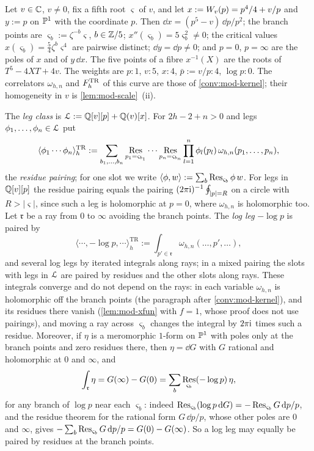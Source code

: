 \begin{defn}
\label{def:mod-curve}
Let $v\in\mathbb{C}$, $v\neq 0$, fix a fifth root $\varsigma$ of $v$, and let $x:=W_{v}(p)=p^4/4+v/p$ and $y:=p$ on $\mathbb{P}^1$ with the coordinate $p$. Then $\dd x=(p^5-v)\,\dd p/p^2$; the branch points are $\varsigma_b:=\zeta^{-b}\varsigma$, $b\in\mathbb{Z}/5$; $x''(\varsigma_b)=5\varsigma_b^2\neq 0$; the critical values $x(\varsigma_b)=\frac54\zeta^b\varsigma^4$ are pairwise distinct; $\dd y=\dd p\neq 0$; and $p=0$, $p=\infty$ are the poles of $x$ and of $y\,\dd x$. The five points of a fibre $x^{-1}(X)$ are the roots of $T^5-4XT+4v$. The weights are $p:1$, $v:5$, $x:4$, $\bar p:=v/p:4$, $\log p:0$. The correlators $\omega_{h,n}$ and $F^{\mathrm{TR}}_h$ of this curve are those of \cref{conv:mod-kernel}; their homogeneity in $v$ is \cref{lem:mod-scale}~(ii).
\end{defn}

\begin{defn}
\label{def:mod-pair}
The \emph{leg class} is $\mathcal{L}:=\mathbb{Q}[v][p]+\mathbb{Q}(v)[x]$. For $2h-2+n>0$ and legs $\phi_1,\dots,\phi_n\in\mathcal{L}$ put
\[
\langle\phi_1\cdots\phi_n\rangle^{\mathrm{TR}}_h:=\sum_{b_1,\dots,b_n}\operatorname*{Res}_{p_1=\varsigma_{b_1}}\cdots\operatorname*{Res}_{p_n=\varsigma_{b_n}}\prod_{l=1}^n\phi_l(p_l)\,\omega_{h,n}(p_1,\dots,p_n),
\]
the \emph{residue pairing}; for one slot we write $\langle\phi,w\rangle:=\sum_b\operatorname*{Res}_{\varsigma_b}\phi\,w$. For legs in $\mathbb{Q}[v][p]$ the residue pairing equals the pairing $(2\pi\mathrm{i})^{-1}\oint_{|p|=R}$ on a circle with $R>|\varsigma|$, since such a leg is holomorphic at $p=0$, where $\omega_{h,n}$ is holomorphic too. Let $\mathfrak r$ be a ray from $0$ to $\infty$ avoiding the branch points. The \emph{log leg} $-\log p$ is paired by
\[
\langle\cdots,-\log p,\cdots\rangle^{\mathrm{TR}}_h:=\int_{p'\in\mathfrak r}\omega_{h,n}(\dots,p',\dots),
\]
and several log legs by iterated integrals along rays; in a mixed pairing the slots with legs in $\mathcal{L}$ are paired by residues and the other slots along rays. These integrals converge and do not depend on the rays: in each variable $\omega_{h,n}$ is holomorphic off the branch points (the paragraph after \cref{conv:mod-kernel}), and its residues there vanish (\cref{lem:mod-xfun} with $f=1$, whose proof does not use pairings), and moving a ray across $\varsigma_b$ changes the integral by $2\pi\mathrm{i}$ times such a residue. Moreover, if $\eta$ is a meromorphic $1$-form on $\mathbb{P}^1$ with poles only at the branch points and zero residues there, then $\eta=\dd G$ with $G$ rational and holomorphic at $0$ and $\infty$, and
\[
\int_{\mathfrak r}\eta=G(\infty)-G(0)=\sum_b\operatorname*{Res}_{\varsigma_b}(-\log p)\,\eta,
\]
for any branch of $\log p$ near each $\varsigma_b$: indeed $\operatorname*{Res}_{\varsigma_b}(\log p\,\mathrm{d} G)=-\operatorname*{Res}_{\varsigma_b}G\,\mathrm{d} p/p$, and the residue theorem for the rational form $G\,\dd p/p$, whose other poles are $0$ and $\infty$, gives $-\sum_b\operatorname*{Res}_{\varsigma_b}G\,\mathrm{d} p/p=G(0)-G(\infty)$. So a log leg may equally be paired by residues at the branch points.
\end{defn}

